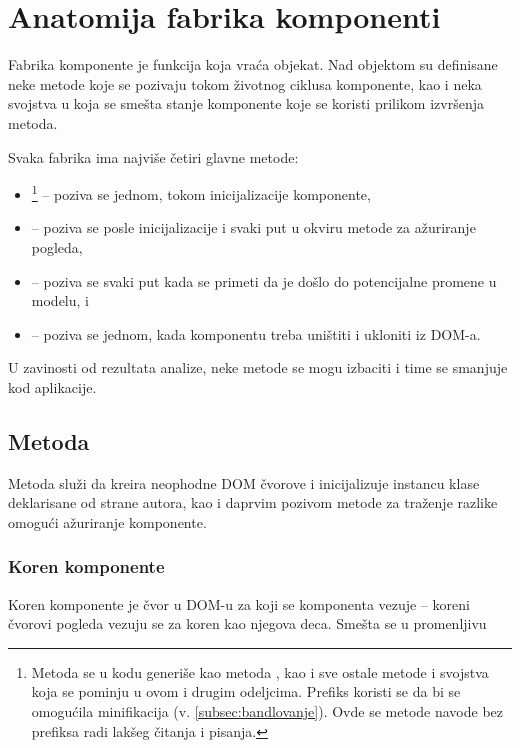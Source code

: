 \section{Anatomija fabrika komponenti}\label{sec:anatomija-fabrika-komponenti}

Fabrika komponente je funkcija koja vraća objekat.
Nad objektom su definisane neke metode koje se pozivaju tokom životnog ciklusa komponente, kao i neka svojstva u koja se smešta stanje komponente koje se koristi prilikom izvršenja metoda.

Svaka fabrika ima najviše četiri glavne metode:

\begin{itemize}
\item {}\footnote{Metoda  se u kodu generiše kao metoda , kao i sve ostale metode i svojstva koja se pominju u ovom i drugim odeljcima. Prefiks  koristi se da bi se omogućila minifikacija (v. \cref{subsec:bandlovanje}). Ovde se metode navode bez prefiksa radi lakšeg čitanja i pisanja.} -- poziva se jednom, tokom inicijalizacije komponente,
\item {} -- poziva se posle inicijalizacije i svaki put u okviru metode za ažuriranje pogleda,
\item {} -- poziva se svaki put kada se primeti da je došlo do potencijalne promene u modelu, i
\item {} -- poziva se jednom, kada komponentu treba uništiti i ukloniti iz DOM-a.
\end{itemize}

U zavinosti od rezultata analize, neke metode se mogu izbaciti i time se smanjuje kod aplikacije.

\subsection{Metoda }

Metoda  služi da kreira neophodne DOM čvorove i inicijalizuje instancu klase deklarisane od strane autora, kao i daprvim pozivom metode za traženje razlike  omogući ažuriranje komponente.

\subsubsection{Koren komponente}

Koren komponente je čvor u DOM-u za koji se komponenta vezuje -- koreni čvorovi pogleda vezuju se za koren kao njegova deca.
Smešta se u promenljivu \code{}

